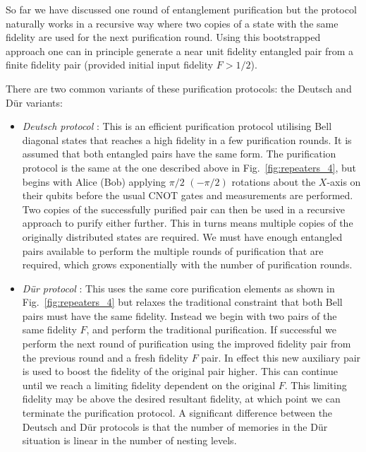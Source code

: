 So far we have discussed one round of entanglement purification but the protocol naturally works in a recursive way where two copies of a state with the same fidelity are used for the next purification round. Using this bootstrapped approach one can in principle generate a near unit fidelity entangled pair from a finite fidelity pair (provided initial input fidelity \mbox{$F>1/2$}). 

There are two common variants of these purification protocols: the Deutsch and D{\"u}r variants:
\begin{itemize}
\item \textit{Deutsch protocol} \cite{bib:Deutsch96}: This is an efficient purification protocol utilising Bell diagonal states that reaches a high fidelity in a few purification rounds. It is assumed that both entangled pairs have the same form. The purification protocol is the same at the one described above in Fig.~\ref{fig:repeaters_4}, but begins with Alice (Bob) applying $\pi/2$ $(-\pi/2)$ rotations about the $X$-axis on their qubits before the usual CNOT gates and measurements are performed. Two copies of the successfully purified pair can then be used in a recursive approach to purify either further. This in turns means multiple copies of the originally distributed states are required. We must have enough entangled pairs available to perform the multiple rounds of purification that are required, which grows exponentially with the number of purification rounds. 

\item \textit{D{\"u}r protocol} \cite{bib:dur98}: This uses the same core purification elements as shown in Fig.~\ref{fig:repeaters_4} but relaxes the traditional constraint that both Bell pairs must have the same fidelity. Instead we begin with two pairs of the same fidelity $F$, and perform the traditional purification. If successful we perform the next round of purification using the improved fidelity pair from the previous round and a fresh fidelity $F$ pair. In effect this new auxiliary pair is used to boost the fidelity of the original pair higher. This can continue until we reach a limiting fidelity dependent on the original $F$. This limiting fidelity may be above the desired resultant fidelity, at which point we can terminate the purification protocol. A significant difference between the Deutsch and D{\"u}r protocols is that the number of memories in the D{\"u}r situation is linear in the number of nesting levels.
\end{itemize}


